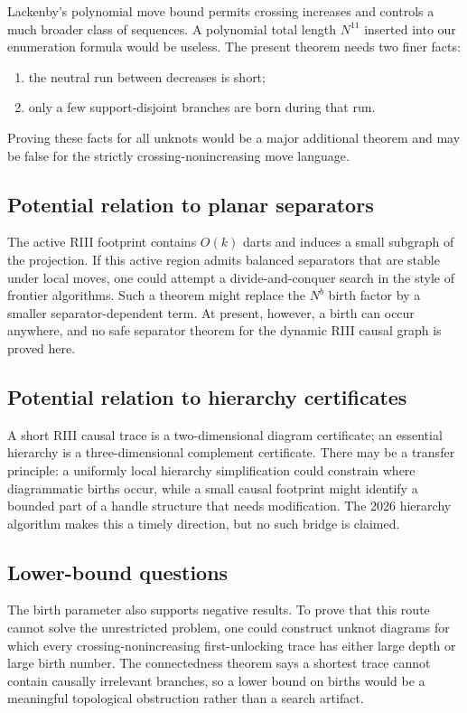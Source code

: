 Lackenby's polynomial move bound permits crossing increases and controls a much
broader class of sequences.  A polynomial total length $N^{11}$ inserted into
our enumeration formula would be useless.  The present theorem needs two finer
facts:
\begin{enumerate}
\item the neutral run between decreases is short;
\item only a few support-disjoint branches are born during that run.
\end{enumerate}
Proving these facts for all unknots would be a major additional theorem and may
be false for the strictly crossing-nonincreasing move language.

\subsection{Potential relation to planar separators}

The active RIII footprint contains $O(k)$ darts and induces a small subgraph of
the projection.  If this active region admits balanced separators that are
stable under local moves, one could attempt a divide-and-conquer search in the
style of frontier algorithms.  Such a theorem might replace the $N^b$ birth
factor by a smaller separator-dependent term.  At present, however, a birth can
occur anywhere, and no safe separator theorem for the dynamic RIII causal graph
is proved here.

\subsection{Potential relation to hierarchy certificates}

A short RIII causal trace is a two-dimensional diagram certificate; an essential
hierarchy is a three-dimensional complement certificate.  There may be a
transfer principle: a uniformly local hierarchy simplification could constrain
where diagrammatic births occur, while a small causal footprint might identify
a bounded part of a handle structure that needs modification.  The 2026
hierarchy algorithm makes this a timely direction, but no such bridge is
claimed.

\subsection{Lower-bound questions}

The birth parameter also supports negative results.  To prove that this route
cannot solve the unrestricted problem, one could construct unknot diagrams for
which every crossing-nonincreasing first-unlocking trace has either large depth
or large birth number.  The connectedness theorem says a shortest trace cannot
contain causally irrelevant branches, so a lower bound on births would be a
meaningful topological obstruction rather than a search artifact.

